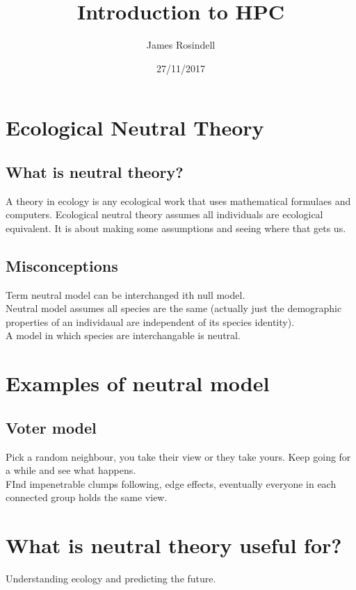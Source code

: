 \documentclass[11pt]{article}
\title{Introduction to HPC}
\date{27/11/2017}
\author{James Rosindell}
\begin{document}
\maketitle
\section{Ecological Neutral Theory}
\subsection{What is neutral theory?}
A theory in ecology is any ecological work that uses mathematical formulaes and computers. Ecological neutral theory assumes all individuals are ecological equivalent. It is about making some assumptions and seeing where that gets us.
\subsection{Misconceptions}
Term neutral model can be interchanged ith null model.\\
Neutral model assumes all species are the same (actually just the demographic properties of an individaual are independent of its species identity).\\
A model in which species are interchangable is neutral.\\
\section{Examples of neutral model}
\subsection{Voter model}
Pick a random neighbour, you take their view or they take yours. Keep going for a while and see what happens. \\
FInd impenetrable clumps following, edge effects, eventually everyone in each connected group holds the same view.
\section{What is neutral theory useful for?}
Understanding ecology and predicting the future.
\end{document}
